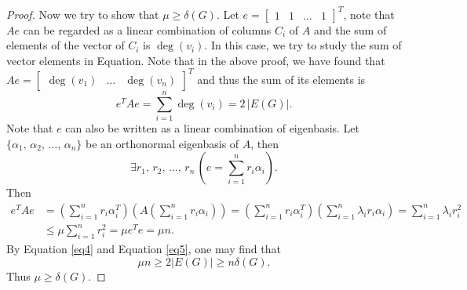 \documentclass{article}
\begin{document}
\begin{proof}
    Now we try to show that $\mu\geq\delta(G)$. Let $e=\begin{bmatrix}
        1 & 1 & \ldots & 1
    \end{bmatrix}^T$, note that $Ae$ can be regarded as a linear combination of columns $C_i$ of $A$ and the sum of elements of the vector of $C_i$ is $\deg(v_i)$. In this case, we try to study the sum of vector elements in Equation. Note that in the above proof, we have found that $Ae=\begin{bmatrix}
        \deg(v_1) & \ldots & \deg(v_n)
    \end{bmatrix}^T$ and thus the sum of its elements is 
    \begin{equation}\label{eq4}
        e^TAe=\sum_{i=1}^{n}\deg(v_i)=2\,\vert E(G)\vert.
    \end{equation}
    Note that $e$ can also be written as a linear combination of eigenbasis. Let $\{\alpha_1,\,\alpha_2,\,\ldots,\,\alpha_n\}$ be an orthonormal eigenbasis of $A$, then
    \begin{equation*}
        \exists r_1,\,r_2,\,\ldots,\,r_n\,(e=\sum_{i=1}^{n}r_i\alpha_i).
    \end{equation*}
    Then
    \begin{equation}\label{eq5}
        \begin{split}
            e^TAe&=(\sum_{i=1}^{n}r_i\alpha^T_i)\left(A(\sum_{i=1}^{n}r_i\alpha_i)\right)=(\sum_{i=1}^{n}r_i\alpha^T_i)(\sum_{i=1}^{n}\lambda_i r_i\alpha_i)=\sum_{i=1}^{n}\lambda_ir_i^2\\
            &\leq\mu\sum_{i=1}^{n}r_i^2=\mu e^Te=\mu n.
        \end{split}
    \end{equation}
    By Equation \eqref{eq4} and Equation \eqref{eq5}, one may find that 
    \begin{equation*}
        \mu n \geq 2 \vert E(G) \vert \geq n \delta(G).
    \end{equation*}
    Thus $\mu\geq\delta(G)$.
\end{proof}
\end{document}
